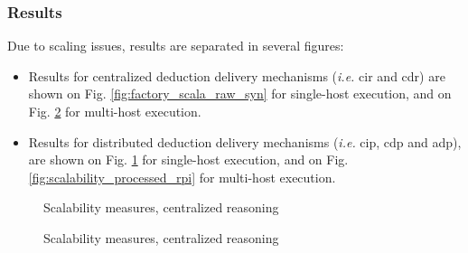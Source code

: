 \documentclass{iosart2c}
\begin{document}
\begin{table}
	\centering
	\caption{Machines hosts for scalability experiments}
	\label{tab:scala_hosts}
\end{table}

\subsubsection{Results}

Due to scaling issues, results are separated in several figures: 
\begin{itemize}
	\item Results for centralized deduction delivery mechanisms (\textit{i.e.} \gls{cir} and \gls{cdr}) are shown on Fig. \ref{fig:factory_scala_raw_syn} for single-host execution, and on Fig. \ref{fig:factory_scala_raw_rpi} for multi-host execution.
	\item Results for distributed deduction delivery mechanisms (\textit{i.e.} \gls{cip}, \gls{cdp} and \gls{adp}), are shown on Fig. \ref{fig:scalability_processed_syn} for single-host execution, and on Fig. \ref{fig:scalability_processed_rpi} for multi-host execution.
\end{itemize}

\begin{figure}
	\Centering
	\caption{Scalability measures, centralized reasoning}
	\label{fig:factory_scala_raw}
	\begin{minipage}{0.395\textwidth}
		\Centering
		\label{fig:factory_scala_raw_syn}
		\scalebox{1}{
			
		}
	\end{minipage}
	\begin{minipage}{0.595\textwidth}
		\Centering
		\label{fig:scalability_processed_syn}
		\scalebox{1}{
			
		}
	\end{minipage}
	
\end{figure}

\begin{figure}
	\caption{Scalability measures, centralized reasoning}
	\label{fig:factory_scala_processed}
	\Centering
	\label{fig:factory_scala_raw_rpi}
	\scalebox{1}{
		
	}
\end{figure}
\end{document}
